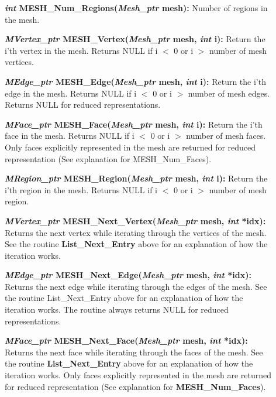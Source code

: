 \documentclass[12pt]{article}
\begin{document}
\begin{description}
\item[]\textbf{\textit{int} MESH\_Num\_Regions(\textit{Mesh\_ptr} mesh):}
Number of regions in the mesh.


\item[]\textbf{\textit{MVertex\_ptr} MESH\_Vertex(\textit{Mesh\_ptr} mesh,
\textit{int} i):} Return the i'th vertex in the mesh. Returns NULL if i
$<$ 0 or i $>$ number of mesh vertices.

\item[]\textbf{\textit{MEdge\_ptr} MESH\_Edge(\textit{Mesh\_ptr} mesh,
\textit{int} i):} Return the i'th edge in the mesh. Returns NULL if i $<$
0 or i $>$ number of mesh edges. Returns NULL for reduced
representations.

\item[]\textbf{\textit{MFace\_ptr} MESH\_Face(\textit{Mesh\_ptr} mesh,
\textit{int} i):} Return the i'th face in the mesh. Returns NULL if i $<$
0 or i $>$ number of mesh faces. Only faces explicitly represented in
the mesh are returned for reduced representation (See explanation for
MESH\_Num\_Faces).

\item[]\textbf{\textit{MRegion\_ptr} MESH\_Region(\textit{Mesh\_ptr} mesh,
\textit{int} i):} Return the i'th region in the mesh. Returns NULL if i
$<$ 0 or i $>$ number of mesh region.


\item[]\textbf{\textit{MVertex\_ptr} MESH\_Next\_Vertex(\textit{Mesh\_ptr}
mesh, \textit{int} *idx):} Returns the next vertex while iterating
through the vertices of the mesh. See the routine \textbf{List\_Next\_Entry}
above for an explanation of how the iteration works.

\item[]\textbf{\textit{MEdge\_ptr} MESH\_Next\_Edge(\textit{Mesh\_ptr} mesh,
\textit{int} *idx):} Returns the next edge while iterating through the
edges of the mesh. See the routine List\_Next\_Entry above for an
explanation of how the iteration works.  The routine always returns
NULL for reduced representations.


\item[]\textbf{\textit{MFace\_ptr} MESH\_Next\_Face(\textit{Mesh\_ptr} mesh,
\textit{int} *idx):} Returns the next face while iterating through the
faces of the mesh. See the routine \textbf{List\_Next\_Entry} above for
an explanation of how the iteration works.  Only faces explicitly
represented in the mesh are returned for reduced representation (See
explanation for \textbf{MESH\_Num\_Faces}).



\end{description}
\end{document}
